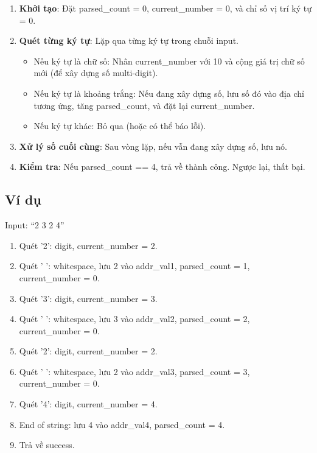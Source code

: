 \begin{enumerate}
    \item \textbf{Khởi tạo}: Đặt parsed\_count = 0, current\_number = 0, và chỉ số vị trí ký tự = 0.
    
    \item \textbf{Quét từng ký tự}: Lặp qua từng ký tự trong chuỗi input.
    \begin{itemize}
        \item Nếu ký tự là chữ số: Nhân current\_number với 10 và cộng giá trị chữ số mới (để xây dựng số multi-digit).
        \item Nếu ký tự là khoảng trắng: Nếu đang xây dựng số, lưu số đó vào địa chỉ tương ứng, tăng parsed\_count, và đặt lại current\_number.
        \item Nếu ký tự khác: Bỏ qua (hoặc có thể báo lỗi).
    \end{itemize}
    
    \item \textbf{Xử lý số cuối cùng}: Sau vòng lặp, nếu vẫn đang xây dựng số, lưu nó.
    
    \item \textbf{Kiểm tra}: Nếu parsed\_count == 4, trả về thành công. Ngược lại, thất bại.
\end{enumerate}

\subsection{Ví dụ}

Input: ``2 3 2 4''

\begin{enumerate}
    \item Quét '2': digit, current\_number = 2.
    \item Quét ' ': whitespace, lưu 2 vào addr\_val1, parsed\_count = 1, current\_number = 0.
    \item Quét '3': digit, current\_number = 3.
    \item Quét ' ': whitespace, lưu 3 vào addr\_val2, parsed\_count = 2, current\_number = 0.
    \item Quét '2': digit, current\_number = 2.
    \item Quét ' ': whitespace, lưu 2 vào addr\_val3, parsed\_count = 3, current\_number = 0.
    \item Quét '4': digit, current\_number = 4.
    \item End of string: lưu 4 vào addr\_val4, parsed\_count = 4.
    \item Trả về success.
\end{enumerate}

